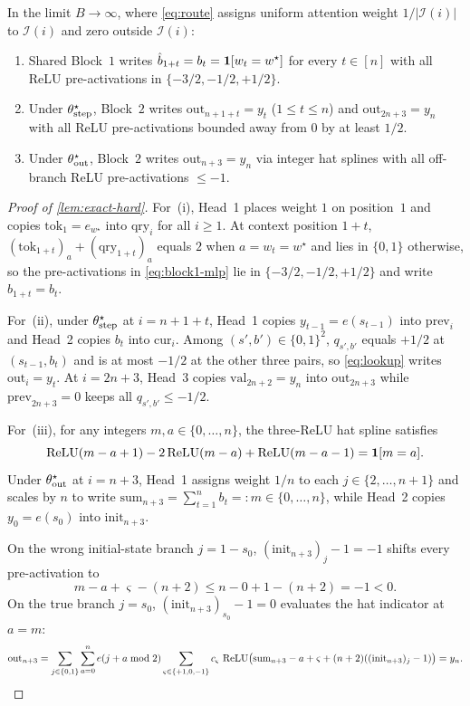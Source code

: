 \begin{lemma}
\label{lem:exact-hard}
In the limit $B \to \infty$, where \cref{eq:route} assigns uniform attention weight $1/|\mathcal I(i)|$ to $\mathcal I(i)$ and zero outside $\mathcal I(i)$:
\begin{enumerate}[label=(\roman*),leftmargin=*]
  \item Shared Block~$1$ writes $\hat b_{1+t} = b_t = \mathbf 1[w_t = w^\star]$ for every $t \in [n]$ with all ReLU pre-activations in $\{-3/2, -1/2, +1/2\}$.
  \item Under $\theta^\star_{\mathrm{step}}$, Block~$2$ writes $\mathrm{out}_{n+1+t} = y_t$ ($1 \le t \le n$) and $\mathrm{out}_{2n+3} = y_n$ with all ReLU pre-activations bounded away from $0$ by at least $1/2$.
  \item Under $\theta^\star_{\mathrm{out}}$, Block~$2$ writes $\mathrm{out}_{n+3} = y_n$ via integer hat splines with all off-branch ReLU pre-activations $\le -1$.
\end{enumerate}
\end{lemma}
\begin{proof}[Proof of \cref{lem:exact-hard}]
For~(i), Head~1 places weight $1$ on position~$1$ and copies $\mathrm{tok}_1 = e_{w^\star}$ into $\mathrm{qry}_i$ for all $i \ge 1$. At context position $1+t$, $(\mathrm{tok}_{1+t})_a + (\mathrm{qry}_{1+t})_a$ equals $2$ when $a = w_t = w^\star$ and lies in $\{0,1\}$ otherwise, so the pre-activations in \cref{eq:block1-mlp} lie in $\{-3/2, -1/2, +1/2\}$ and write $\hat b_{1+t} = b_t$.

For~(ii), under $\theta^\star_{\mathrm{step}}$ at $i = n+1+t$, Head~1 copies $y_{t-1} = e(s_{t-1})$ into $\mathrm{prev}_i$ and Head~2 copies $b_t$ into $\mathrm{cur}_i$. Among $(s', b') \in \{0,1\}^2$, $q_{s',b'}$ equals $+1/2$ at $(s_{t-1}, b_t)$ and is at most $-1/2$ at the other three pairs, so \cref{eq:lookup} writes $\mathrm{out}_i = y_t$. At $i = 2n+3$, Head~3 copies $\mathrm{val}_{2n+2} = y_n$ into $\mathrm{out}_{2n+3}$ while $\mathrm{prev}_{2n+3} = 0$ keeps all $q_{s',b'} \le -1/2$.

For~(iii), for any integers $m, a \in \{0, \ldots, n\}$, the three-ReLU hat spline satisfies
\[
  \operatorname{ReLU}(m - a + 1) - 2\operatorname{ReLU}(m - a) + \operatorname{ReLU}(m - a - 1) = \mathbf 1[m = a].
\]
Under $\theta^\star_{\mathrm{out}}$ at $i = n+3$, Head~1 assigns weight $1/n$ to each $j \in \{2, \ldots, n+1\}$ and scales by $n$ to write $\mathrm{sum}_{n+3} = \sum_{t=1}^n b_t =: m \in \{0,\ldots,n\}$, while Head~2 copies $y_0 = e(s_0)$ into $\mathrm{init}_{n+3}$.

On the wrong initial-state branch $j = 1 - s_0$, $(\mathrm{init}_{n+3})_j - 1 = -1$ shifts every pre-activation to
\[
  m - a + \varsigma - (n+2) \le n - 0 + 1 - (n+2) = -1 < 0.
\]
On the true branch $j = s_0$, $(\mathrm{init}_{n+3})_{s_0} - 1 = 0$ evaluates the hat indicator at $a = m$:
\begin{equation}
 \mathrm{out}_{n+3} = \sum_{j\in\{0,1\}}\sum_{a=0}^n e(j+a\bmod 2)\sum_{\varsigma\in\{+1,0,-1\}} c_\varsigma\,\operatorname{ReLU}\bigl(\mathrm{sum}_{n+3} - a + \varsigma + (n+2)((\mathrm{init}_{n+3})_j - 1)\bigr) = y_n.\qedhere
 \label{eq:outcome-hat}
\end{equation}
\end{proof}

